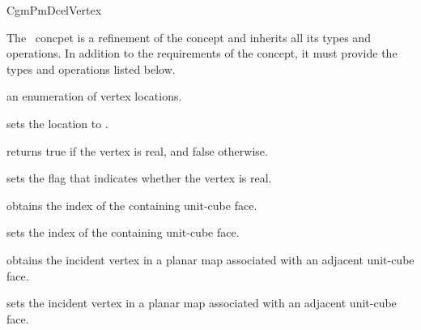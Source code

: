 \ccRefPageBegin

\begin{ccRefConcept}{CgmPmDcelVertex}


The \ccRefName\ concpet is a refinement of the 
concept and inherits all its types and operations. In addition to the
requirements of the  concept, it must provide the
types and operations listed below.

\ccConstants
  {an enumeration of vertex locations.}
  
\ccOperations
  
  {sets the location to .}

  {returns true if the vertex is real, and false otherwise.}

  {sets the flag that indicates whether the vertex is real.}

  {obtains the index of the containing unit-cube face.}

  {sets the index of the containing unit-cube face.}

  {obtains the incident vertex in a planar map associated with an adjacent
  unit-cube face.}
          
  {sets the incident vertex in a planar map associated with an adjacent
  unit-cube face.}

\end{ccRefConcept}
\ccRefPageEnd
